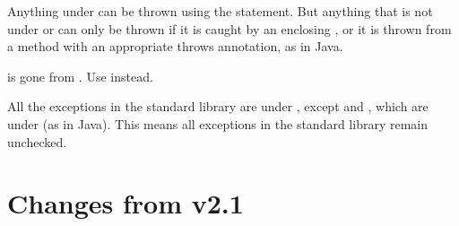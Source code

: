 \begin{enumerate}
  Anything under  can be thrown using the 
  statement. But anything that is not under  or  can
  only be thrown if it is caught by an enclosing , or it is
  thrown from a method with an appropriate throws annotation, as in
  Java.

   is gone from \Xten{}.  Use  instead.

  All the exceptions in the standard library are under ,
  except  and , which are under
   (as in Java).  This means all exceptions in the standard
  library remain unchecked.

\end{enumerate}

\section{Changes from \Xten{} v2.1}

